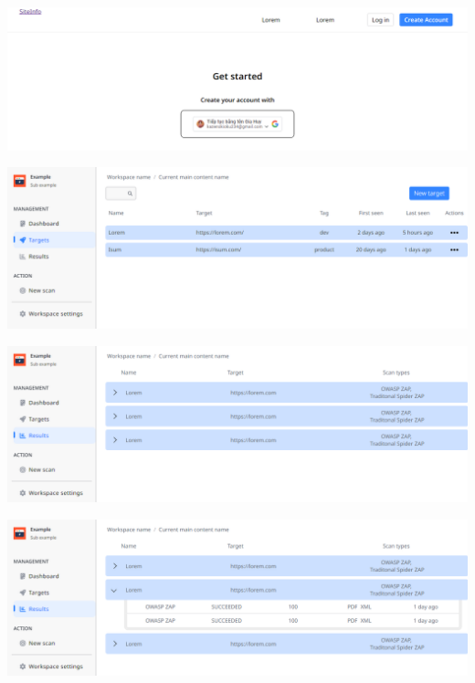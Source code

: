 \includegraphics[width=\textwidth]{images/prototype/prototype_25102022/signup.png}

\vspace{0.2cm}

\includegraphics[width=\textwidth]{images/prototype/prototype_25102022/dashboard_target.png}

\vspace{0.2cm}

\includegraphics[width=\textwidth]{images/prototype/prototype_25102022/dashboard_result.png}

\vspace{0.2cm}

\includegraphics[width=\textwidth]{images/prototype/prototype_25102022/dashboard_result_opening-sub.png}

